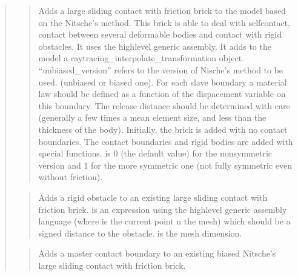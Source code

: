 \documentclass[a4paper,11pt,english]{sphinxmanual}
\begin{document}
\begin{quote}
\begin{quote}
Adds a large sliding contact with friction brick to the model based on the Nitsche’s method.
This brick is able to deal with self\sphinxhyphen{}contact, contact between
several deformable bodies and contact with rigid obstacles.
It uses the high\sphinxhyphen{}level generic assembly. It adds to the model
a raytracing\_interpolate\_transformation object. “unbiased\_version” refers to the version of Nische’s method to be used.
(unbiased or biased one).
For each slave boundary a  material law should be defined as a function of the dispacement variable on this boundary.
The release distance should be determined with care
(generally a few times a mean element size, and less than the
thickness of the body). Initially, the brick is added with no contact
boundaries. The contact boundaries and rigid bodies are added with
special functions.  is 0 (the default value) for the
non\sphinxhyphen{}symmetric version and 1 for the more symmetric one
(not fully symmetric even without friction).
\end{quote}

\begin{quote}

Adds a rigid obstacle to an existing large sliding contact
with friction brick.  is an expression using the high\sphinxhyphen{}level
generic assembly language (where  is the current point n the mesh)
which should be a signed distance to the obstacle.
 is the mesh dimension.
\end{quote}

\begin{quote}

Adds a master contact boundary to an existing biased Nitsche’s large sliding contact
with friction brick.
\end{quote}

\begin{quote}


\end{quote}
\end{quote}
\end{document}
